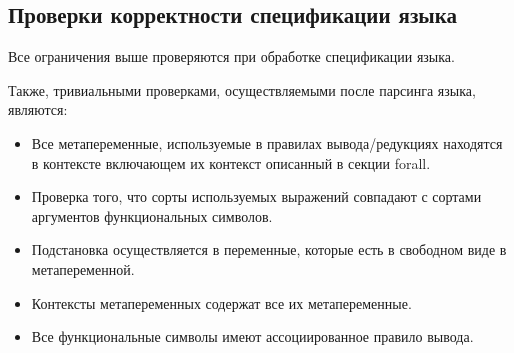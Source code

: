 \subsection{Проверки корректности спецификации языка}

Все ограничения выше проверяются при обработке спецификации языка.

Также, тривиальными проверками, осуществляемыми после парсинга языка, являются:
\begin{itemize}
\item Все метапеременные, используемые в правилах вывода/редукциях находятся в контексте включающем их контекст описанный в секции forall.
\item Проверка того, что сорты используемых выражений совпадают с сортами аргументов функциональных символов.
\item Подстановка осуществляется в переменные, которые есть в свободном виде в метапеременной.
\item Контексты метапеременных содержат все их метапеременные.
\item Все функциональные символы имеют ассоциированное правило вывода.
\end{itemize}
